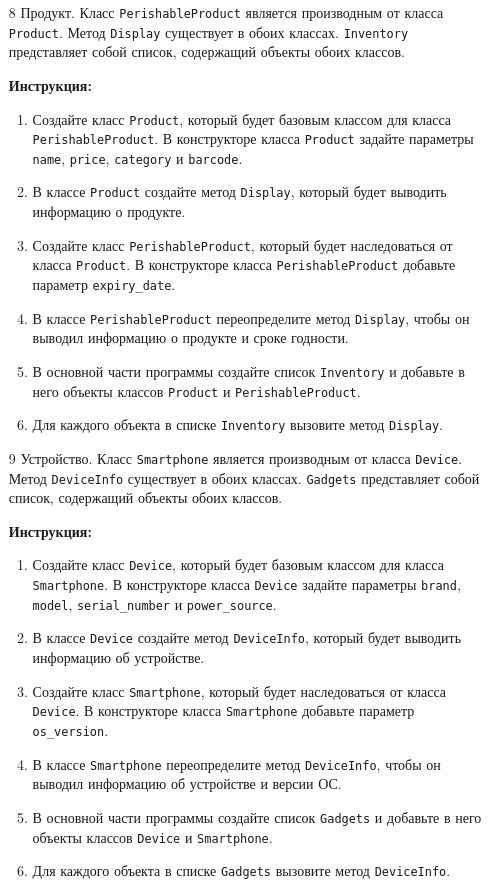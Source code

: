 \begin{enumerate}
\item[8]
Продукт. Класс \texttt{PerishableProduct} является производным от класса \texttt{Product}. Метод \texttt{Display} существует в обоих классах. \texttt{Inventory} представляет собой список, содержащий объекты обоих классов.

\textbf{Инструкция:}
\begin{enumerate}
    \item Создайте класс \texttt{Product}, который будет базовым классом для класса \texttt{PerishableProduct}. В конструкторе класса \texttt{Product} задайте параметры \texttt{name}, \texttt{price}, \texttt{category} и \texttt{barcode}.
    \item В классе \texttt{Product} создайте метод \texttt{Display}, который будет выводить информацию о продукте.
    \item Создайте класс \texttt{PerishableProduct}, который будет наследоваться от класса \texttt{Product}. В конструкторе класса \texttt{PerishableProduct} добавьте параметр \texttt{expiry\_date}.
    \item В классе \texttt{PerishableProduct} переопределите метод \texttt{Display}, чтобы он выводил информацию о продукте и сроке годности.
    \item В основной части программы создайте список \texttt{Inventory} и добавьте в него объекты классов \texttt{Product} и \texttt{PerishableProduct}.
    \item Для каждого объекта в списке \texttt{Inventory} вызовите метод \texttt{Display}.
\end{enumerate}

\item[9]
Устройство. Класс \texttt{Smartphone} является производным от класса \texttt{Device}. Метод \texttt{DeviceInfo} существует в обоих классах. \texttt{Gadgets} представляет собой список, содержащий объекты обоих классов.

\textbf{Инструкция:}
\begin{enumerate}
    \item Создайте класс \texttt{Device}, который будет базовым классом для класса \texttt{Smartphone}. В конструкторе класса \texttt{Device} задайте параметры \texttt{brand}, \texttt{model}, \texttt{serial\_number} и \texttt{power\_source}.
    \item В классе \texttt{Device} создайте метод \texttt{DeviceInfo}, который будет выводить информацию об устройстве.
    \item Создайте класс \texttt{Smartphone}, который будет наследоваться от класса \texttt{Device}. В конструкторе класса \texttt{Smartphone} добавьте параметр \texttt{os\_version}.
    \item В классе \texttt{Smartphone} переопределите метод \texttt{DeviceInfo}, чтобы он выводил информацию об устройстве и версии ОС.
    \item В основной части программы создайте список \texttt{Gadgets} и добавьте в него объекты классов \texttt{Device} и \texttt{Smartphone}.
    \item Для каждого объекта в списке \texttt{Gadgets} вызовите метод \texttt{DeviceInfo}.
\end{enumerate}


\end{enumerate}
